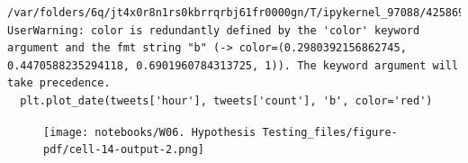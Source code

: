 \documentclass[
  letterpaper,
  DIV=11,
  numbers=noendperiod]{scrreprt}
\begin{document}
\begin{verbatim}
/var/folders/6q/jt4x0r8n1rs0kbrrqrbj61fr0000gn/T/ipykernel_97088/4258694155.py:17: UserWarning: color is redundantly defined by the 'color' keyword argument and the fmt string "b" (-> color=(0.2980392156862745, 0.4470588235294118, 0.6901960784313725, 1)). The keyword argument will take precedence.
  plt.plot_date(tweets['hour'], tweets['count'], 'b', color='red')
\end{verbatim}

\begin{figure}[H]

{\centering \texttt{[image: notebooks/W06. Hypothesis Testing\_files/figure-pdf/cell-14-output-2.png]}

}

\end{figure}
\end{document}
